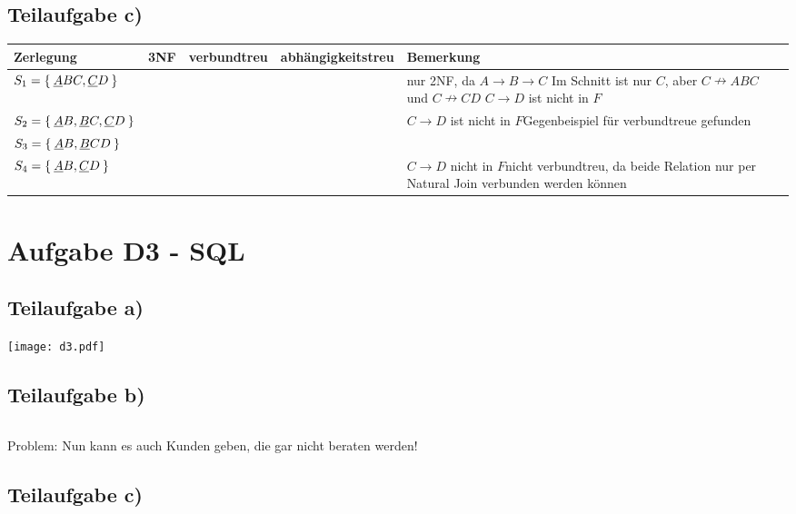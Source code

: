 \documentclass[a4paper]{scrartcl}
\newcommand{\cmark}{\ding{51}}%
\newcommand{\xmark}{\ding{55}}%
\begin{document}
\subsection{Teilaufgabe c)}

\begin{tabular}{lcp{1cm}p{2cm}p{5cm}}
    Zerlegung                                       & 3NF    & ver\-bund\-treu & ab\-hängigkeits\-treu & Bemerkung\\
    \hline
    $S_1 = \Set{\underline{A}BC, \underline{C}D}$   & \xmark & \xmark      & \xmark            & nur 2NF, da $A \rightarrow B \rightarrow C$ \newline Im Schnitt ist nur $C$, aber $C \nrightarrow ABC$ und $C \nrightarrow CD$ \newline $C \rightarrow D$ ist nicht in $F$ \\
    $S_2 = \Set{\underline{A}B, \underline{B}C, \underline{C}D}$ & \cmark & \xmark & \xmark    & $C \rightarrow D$ ist nicht in $F$\newline Gegenbeispiel für verbundtreue gefunden\\
    $S_3 = \Set{\underline{A}B, \underline{B}CD}$ & \cmark   & \cmark      & \cmark            & \\
    $S_4 = \Set{\underline{A}B, \underline{C}D}$  & \cmark   & \xmark      & \xmark            & $C \rightarrow D$ nicht in $F$\newline nicht verbundtreu, da beide Relation nur per Natural Join verbunden werden können
\end{tabular}
\clearpage

\section{Aufgabe D3 - SQL}
\subsection{Teilaufgabe a)}
\texttt{[image: d3.pdf]}

\subsection{Teilaufgabe b)}
\inputminted[linenos, numbersep=5pt, tabsize=4]{sql}{d3b.sql}

Problem: Nun kann es auch Kunden geben, die gar nicht beraten werden!

\subsection{Teilaufgabe c)}
\inputminted[linenos, numbersep=5pt, tabsize=4]{sql}{d3c.sql}
\end{document}
